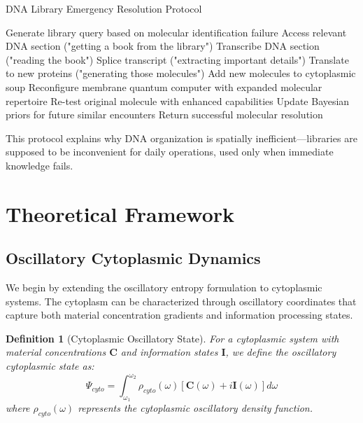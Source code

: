 \documentclass[12pt,a4paper]{article}
\newtheorem{definition}{Definition}
\begin{document}
\begin{algorithm}
\caption{DNA Library Emergency Resolution Protocol}
\begin{algorithmic}
    \State Generate library query based on molecular identification failure
    \State Access relevant DNA section ("getting a book from the library")
    \State Transcribe DNA section ("reading the book")
    \State Splice transcript ("extracting important details")
    \State Translate to new proteins ("generating those molecules")
    \State Add new molecules to cytoplasmic soup
    \State Reconfigure membrane quantum computer with expanded molecular repertoire
    \State Re-test original molecule with enhanced capabilities
    \State Update Bayesian priors for future similar encounters
    \State Return successful molecular resolution
\EndProcedure
\end{algorithmic}
\end{algorithm}

This protocol explains why DNA organization is spatially inefficient—libraries are supposed to be inconvenient for daily operations, used only when immediate knowledge fails.

\section{Theoretical Framework}

\subsection{Oscillatory Cytoplasmic Dynamics}

We begin by extending the oscillatory entropy formulation to cytoplasmic systems. The cytoplasm can be characterized through oscillatory coordinates that capture both material concentration gradients and information processing states.

\begin{definition}[Cytoplasmic Oscillatory State]
For a cytoplasmic system with material concentrations $\mathbf{C}$ and information states $\mathbf{I}$, we define the oscillatory cytoplasmic state as:
\begin{equation}
\Psi_{cyto} = \int_{\omega_1}^{\omega_2} \rho_{cyto}(\omega) [\mathbf{C}(\omega) + i\mathbf{I}(\omega)] d\omega
\end{equation}
where $\rho_{cyto}(\omega)$ represents the cytoplasmic oscillatory density function.
\end{definition}
\end{document}

